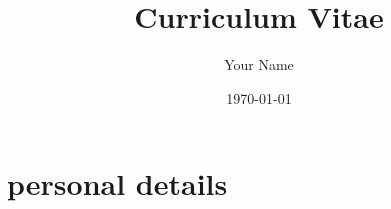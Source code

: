\documentclass[a4paper, 11pt]{article}
\begin{document}




	\title{Curriculum Vitae}
	\author{Your Name}
	\date{\today}

	\def \cvscaleazero{none}
	\def \cvscaleaone{poor}
	\def \cvscaleatwo{bad}
	\def \cvscaleathree{extensible}
	\def \cvscaleafour{ok}
	\def \cvscaleafive{mediocre}
	\def \cvscaleasix{skilled}
	\def \cvscaleaseven{good}
	\def \cvscaleaeight{very good}
	\def \cvscaleanine{professional}
	\def \cvscaleaten{very professional}



	\selectfont
    \linespread{1.25}
	\graphicspath{ {./img/} }



    \maketitle



	\section{personal details}

\end{document}
